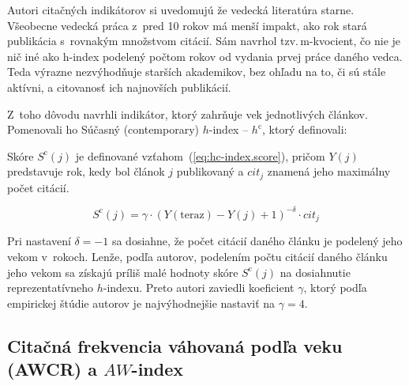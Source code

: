 Autori citačných indikátorov si uvedomujú že vedecká literatúra starne.
Všeobecne vedecká práca z~pred 10 rokov má menší impakt, ako rok stará
publikácia s~rovnakým množstvom citácií.  Sám \citet{Hirsch2005} navrhol
tzv.\,m-kvocient, čo nie je nič iné ako h-index podelený počtom rokov od vydania
prvej práce daného vedca.  Teda výrazne nezvýhodňuje starších akademikov, bez
ohľadu na to, či sú stále aktívni, a citovanosť ich najnovších publikácií.

Z~toho dôvodu \citet{Sidiropoulos2007} navrhli indikátor, ktorý zahrňuje vek
jednotlivých článkov.  Pomenovali ho Súčasný (contemporary)
$h$-index -- $h^{\mathrm{c}}$, ktorý definovali:


Skóre $S^{\mathrm{c}}(j)$ je definované vzťahom~(\ref{eq:hc-index.score}),
pričom $Y(j)$ predstavuje rok, kedy bol článok $j$ publikovaný a
$\mathit{cit}_j$ znamená jeho maximálny počet citácií.

\begin{equation}
\label{eq:hc-index.score}
S^{\mathrm{c}}(j) = \gamma\cdot (Y(\mathrm{teraz}) - Y(j) + 1)^{-\delta}\cdot \mathit{cit}_j
\end{equation}

Pri nastavení $\delta = -1$ sa dosiahne, že počet citácií daného článku je
podelený jeho vekom v~rokoch.  Lenže, podľa autorov, podelením počtu citácií
daného článku jeho vekom sa získajú príliš malé hodnoty skóre
$S^{\mathrm{c}}(j)$ na dosiahnutie reprezentatívneho $h$-indexu.  Preto autori
zaviedli koeficient $\gamma$, ktorý podľa empirickej štúdie autorov je
najvýhodnejšie nastaviť na $\gamma = 4$.

\subsection{Citačná frekvencia váhovaná podľa veku (AWCR) a $\mathit{AW}$-index}
\label{sec:aw-index}

